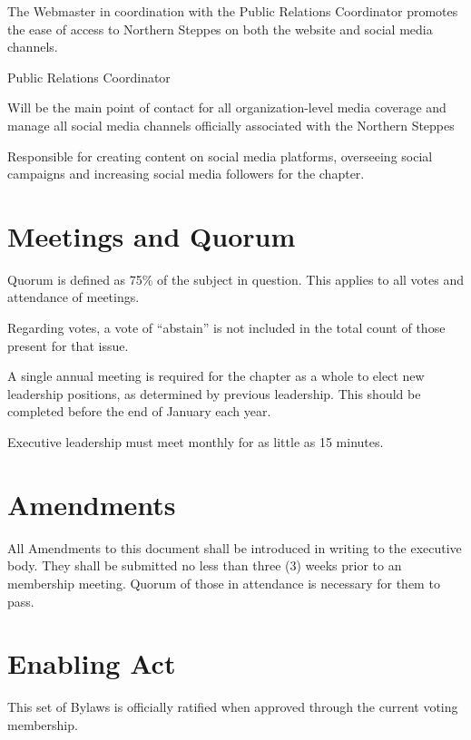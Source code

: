 \documentclass[12pt]{article}
\begin{document}
\begin{level}
\begin{level}
\begin{level}
            \item The Webmaster in coordination with the Public Relations Coordinator promotes the ease of access to Northern Steppes on both the website and social media channels.
        \end{level}
        \item Public Relations Coordinator
        \begin{level} 
            \item Will be the main point of contact for all organization-level media coverage and manage all social media channels officially associated with the Northern Steppes
            \item Responsible for creating content on social media platforms, overseeing social campaigns and increasing social media followers for the chapter.
        \end{level}
    \end{level}

\end{level}

\section{Meetings and Quorum}
\begin{level} 
    \item Quorum is defined as 75\% of the subject in question. This applies to all votes and attendance of meetings.
    \begin{level} 
        \item Regarding votes, a vote of “abstain” is not included in the total count of those present for that issue.
    \end{level}
    \item A single annual meeting is required for the chapter as a whole to elect new leadership positions, as determined by previous leadership. This should be completed before the end of January each year.
    \item Executive leadership must meet monthly for as little as 15 minutes.
\end{level}

\section{Amendments}
\begin{level} 
    \item All Amendments to this document shall be introduced in writing to the executive body. They shall be submitted no less than three (3) weeks prior to an membership meeting. Quorum of those in attendance is necessary for them to pass.
\end{level}

\section{Enabling Act}
\begin{level} 
    \item This set of Bylaws is officially ratified when approved through the current voting membership.
\end{level}
\end{document}

